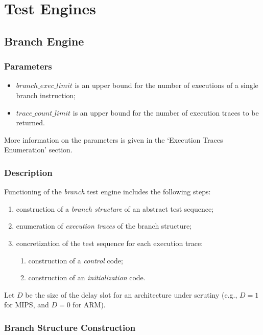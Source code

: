 \chapter{Test Engines}

\section{Branch Engine}

\subsection{Parameters}

\begin{itemize}
\item $branch\_exec\_limit$ is an upper bound for the number of executions of a single branch instruction;
\item $trace\_count\_limit$ is an upper bound for the number of execution traces to be returned.
\end{itemize}

More information on the parameters is given in the `Execution Traces Enumeration' section.

\subsection{Description}

Functioning of the \emph{branch} test engine includes the following steps:

\begin{enumerate}
  \item construction of a \emph{branch structure} of an abstract test sequence;
  \item enumeration of \emph{execution traces} of the branch structure;
  \item concretization of the test sequence for each execution trace:
  \begin{enumerate}
    \item construction of a \emph{control} code;
    \item construction of an \emph{initialization} code.
  \end{enumerate}
\end{enumerate}

Let $D$ be the size of the delay slot for an architecture under scrutiny (e.g., $D = 1$ for MIPS, and $D = 0$ for ARM).

\subsection{Branch Structure Construction}


